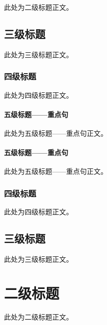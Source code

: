 
此处为二级标题正文。
\subsection{三级标题}
此处为三级标题正文。
\subsubsection{四级标题}
此处为四级标题正文。
\paragraph{五级标题——重点句}
此处为五级标题——重点句正文。
\paragraph{五级标题——重点句}
此处为五级标题——重点句正文。
\subsubsection{四级标题}
此处为四级标题正文。
\subsection{三级标题}
此处为三级标题正文。
\section{二级标题}
此处为二级标题正文。
